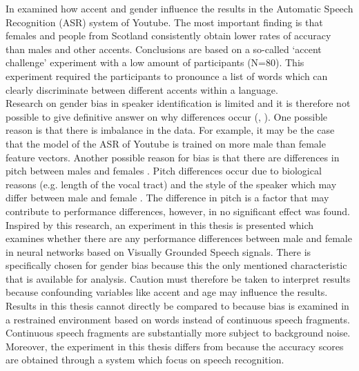 \documentclass[a4paper, oneside]{book}
\begin{document}
In \cite{Tatman2017GenderAD} examined how accent and gender influence the results in the Automatic Speech Recognition (ASR) system of Youtube. The most important finding is that females and people from Scotland consistently obtain lower rates of accuracy than males and other accents.  Conclusions are based on a so-called ‘accent challenge’ experiment with a low amount of participants (N=80). This experiment required the participants to pronounce a list of words which can clearly discriminate between different accents within a language. \\

Research on gender bias in speaker identification is limited and it is therefore not possible to give definitive answer on why differences occur (\cite{Tatman2017GenderAD}, \cite{abdulla2001improving}). One possible reason is that there is imbalance in the data. For example, it may be the case that the model of the ASR of Youtube is trained on more male than female feature vectors. Another possible reason for bias is that there are differences in pitch between males and females \cite{latinus2012discriminating}. Pitch differences occur due to biological reasons (e.g. length of the vocal tract) and the style of the speaker which may differ between male and female \cite{meena2013gender}. The difference in pitch is a factor that may contribute to performance differences, however, in \cite{Tatman2017GenderAD} no significant effect was found. \\

Inspired by this research, an experiment in this thesis is presented which examines whether there are any performance differences between male and female in neural networks based on Visually Grounded Speech signals. There is specifically chosen for gender bias because this the only mentioned characteristic that is available for analysis. Caution must therefore be taken to interpret results because confounding variables like accent and age may influence the results. \\ 

Results in this thesis cannot directly be compared to \cite{Tatman2017GenderAD} because bias is examined in a restrained environment based on words instead of continuous speech fragments. Continuous speech fragments are substantially more subject to background noise. Moreover, the experiment in this thesis differs from \cite{Tatman2017GenderAD} because the accuracy scores are obtained through a system which focus on speech recognition. 


\end{document}
